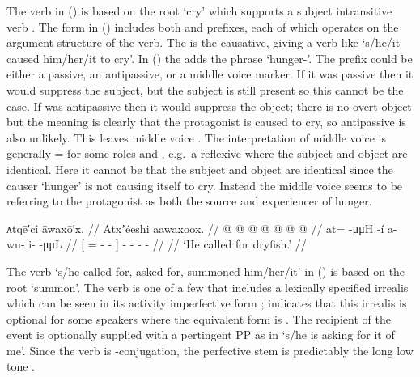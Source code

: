 The verb in (\lastx) is based on the root  ‘cry’ which supports a subject intransitive verb .
The form in (\lastx) includes both  and  prefixes, each of which operates on the argument structure of the verb.
The  is the causative, giving a verb like  ‘s/he/it caused him/her/it to cry’.
In (\lastx) the  adds the phrase  ‘hunger-’.
The  prefix could be either a passive, an antipassive, or a middle voice marker.
If it was passive then it would suppress the subject, but the subject  is still present so this cannot be the case.
If  was antipassive then it would suppress the object; there is no overt object but the meaning is clearly that the protagonist is caused to cry, so antipassive  is also unlikely.
This leaves middle voice .
The interpretation of middle voice is generally  =  for some roles  and , e.g.\ a reflexive where the subject and object are identical.
Here it cannot be that the subject and object are identical since the causer ‘hunger’ is not causing itself to cry.
Instead the middle voice seems to be referring to the protagonist as both the source and experiencer of hunger.

\ex\label{ex:100-8-ask-for-dryfish}%
%
\begingl
	\glpreamble	ᴀtqē′cî āwaxō′x. //
	\glpreamble	Atx̱ʼéeshi aawax̱oox̱. //
	\gla	{}  @ {} @ {} @ {} {}
			 @ {} @ {} @ {} @ {}  //
	\glb	{} at=  -μμH -í {}
			a- wu- i-  -μμL //
	\glc	{}[ =  - - {}]
			- - -  - //
	\gld	{}  {} {} {} {}
			 {} {} {} {} {} {} //
	\glft	‘He called for dryfish.’
		//
\endgl
\xe

The verb  ‘s/he called for, asked for, summoned him/her/it’ in (\lastx) is based on the root  ‘summon’.
The verb is one of a few that includes a lexically specified irrealis  which can be seen in its activity imperfective form ; \textcite{eggleston:2017} indicates that this irrealis is optional for some speakers where the equivalent form is .
The recipient of the event is optionally supplied with a pertingent PP as in  ‘s/he is asking for it of me’.
Since the verb is -conjugation, the perfective stem is predictably the long low tone .

